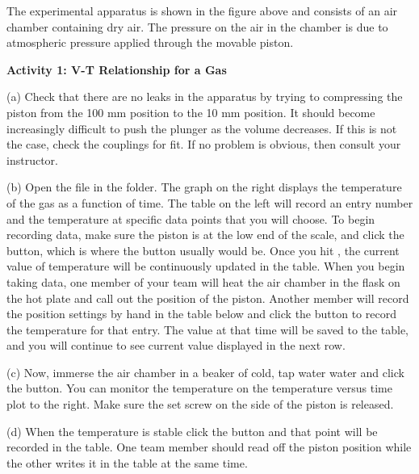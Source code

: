 The experimental apparatus is shown in the figure above and consists
of an air chamber containing dry air. The pressure on the air in the chamber is due to atmospheric
pressure applied through the movable piston.

\textbf{Activity 1: V-T Relationship for a Gas} \nopagebreak

(a) Check that there are no leaks in the apparatus by trying to compressing
the piston from the 100 mm position to the 10 mm position. It should become
increasingly difficult to push the plunger as the volume decreases. If this
is not the case, check the couplings for fit. If no problem is obvious, then
consult your instructor. 

(b) Open the file  in the \filename{\coursefolder} folder.
The graph on the right displays the temperature of the gas as a function of time.  
The table on the left will record an entry number and the temperature at specific data points that you will choose. 
To begin recording data, make sure the piston is at the low end of the scale, and click
the  button, which is where the  button usually would be. 
Once you hit , the current value of temperature will be continuously updated in the table. When you begin taking data, one member of your team will heat the air chamber in the flask on the hot plate 
and call out the position of the piston.
Another member will record the position settings by hand in the table below
and
click the  button to record the 
temperature for that entry.
The value at that time will be saved to the table, and you will continue to see current value displayed in the next row.




(c) Now, immerse the air chamber in a beaker of cold, tap water water and click
the  button. You can monitor the temperature
on the temperature versus time plot to the right.
Make sure the set screw on the side of the piston is released.

(d) When the temperature is stable click the  button and that point will be recorded in the
table. One team member should read off the piston position while the other 
writes it in the table at the same time.

